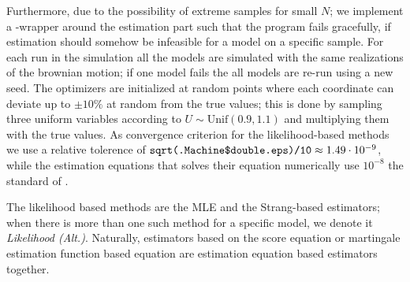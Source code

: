 Furthermore, due to the possibility of extreme samples for small $N$; we implement a -wrapper around the estimation part such that the program fails gracefully, if estimation should somehow be infeasible for a model on a specific sample. For each run in the simulation all the models are simulated with the same realizations of the brownian motion; if one model fails the all models are re-run using a new seed. The optimizers are initialized at random points where each coordinate can deviate up to $\pm 10\%$ at random from the true values; this is done by sampling three uniform variables according to $U\sim\mathrm{Unif}(0.9, 1.1)$ and multiplying them with the true values. As convergence criterion for the likelihood-based methods we use a relative tolerence of $\texttt{sqrt(.Machine\$double.eps)/10}\approx 1.49\cdot 10^{-9}$, while the estimation equations that solves their equation numerically use $10^{-8}$ the standard of . 

The likelihood based methods are the MLE and the Strang-based estimators; when there is more than one such method for a specific model, we denote it \textit{Likelihood (Alt.)}. Naturally, estimators based on the score equation or martingale estimation function based equation are estimation equation based estimators together.
